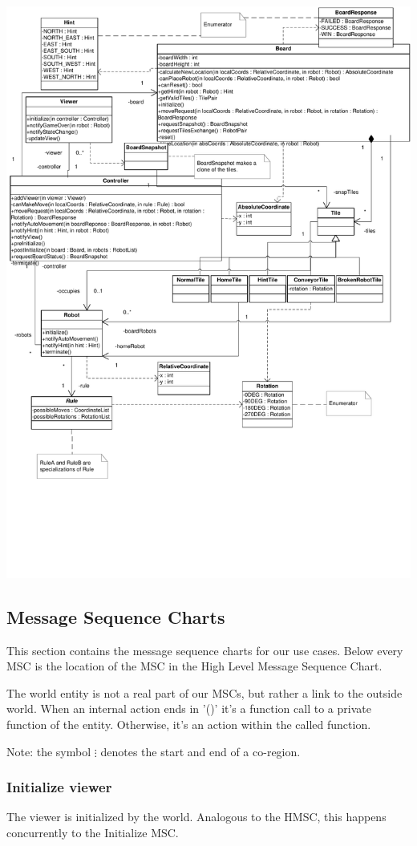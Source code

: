 	\includegraphics[width=\linewidth]{classdiagram}

\subsection{Message Sequence Charts}
	This section contains the message sequence charts for our use cases. Below every MSC is the location of the MSC in the High Level Message Sequence Chart.

	The world entity is not a real part of our MSCs, but rather a link to the outside world. When an internal action ends in '()' it's a function call to a private function of the entity. Otherwise, it's an action within the called function.

	Note: the symbol $\vdots$ denotes the start and end of a co-region.

	\subsubsection{Initialize viewer}
	The viewer is initialized by the world. Analogous to the HMSC, this happens concurrently to the Initialize MSC.
	
